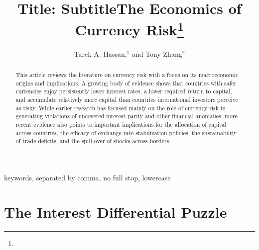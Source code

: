 \documentclass{ar-1col}
\begin{document}

\title{Title: Subtitle}


\author{Tarek A. Hassan,$^1$ and Tony Zhang$^2$  }



\title{The Economics of Currency Risk\thanks{}}



\begin{abstract}
  This article reviews the literature on currency risk with a focus on
  its macroeconomic origins and implications. A growing body of
  evidence shows that countries with safer currencies enjoy
  persistently lower interest rates, a lower required return to
  capital, and accumulate relatively more capital than countries
  international investors perceive as risky. While earlier research
  has focused mainly on the role of currency risk in generating
  violations of uncovered interest parity and other financial
  anomalies, more recent evidence also points to important
  implications for the allocation of capital across countries, the
  efficacy of exchange rate stabilization policies, the sustainability
  of trade deficits, and the spill-over of shocks across borders.
\end{abstract}


\begin{keywords}
  keywords, separated by comma, no full stop, lowercase
\end{keywords}
\maketitle










\section{The Interest Differential Puzzle}
\end{document}
